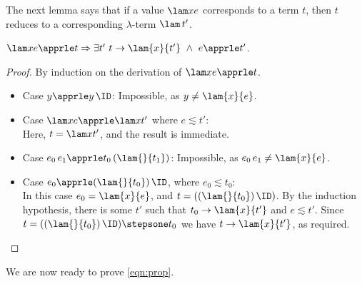 The next lemma says that if a value $\lam xe$ corresponds
to a term $t$, then $t$ reduces to a corresponding $\lambda$-term $\lam\,t'$.

\begin{lemma}
\label{lem:value-reduction}
$\lam xe\apprle t \Rightarrow \exists t'\ t \to \lam{x}{t'}\ \wedge\ e \apprle t'$.
\end{lemma}
\begin{proof}
By induction on the derivation of $\lam xe\apprle t$.
\begin{itemize}
\item Case $y\apprle y\,\ID$: Impossible, as $y \ne \lam{x}{e}$.
\item Case $\lam xe \apprle \lam x{t'}$ where $e\apprle t'$: \\
Here, $t = \lam x{t'}$, and the result is immediate.

\item Case $e_0\,e_1 \apprle t_0\,(\lam{}{t_1})$: Impossible, as $e_0\,e_1 \ne \lam{x}{e}$.

\item Case $e_0 \apprle (\lam{}{t_0})\,\ID $, where $e_0\apprle t_0$: \\ In this case
$e_0 = \lam{x}{e}$, and $t =((\lam{}{t_0})\,\ID )$. By the induction
hypothesis, there is some $t'$ such that $t_0 \to 
\lam{x}{t'}$ and $e \apprle t'$. Since $t =((\lam{}{t_0})\,\ID ) \stepsone t_0$ we
have $t \to \lam{x}{t'}$, as required.
\end{itemize}
\end{proof}

We are now ready to prove \eqref{eqn:prop}.

